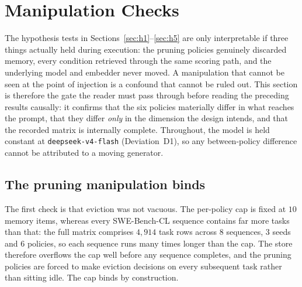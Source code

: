 

\section{Manipulation Checks}
\label{sec:manipulation-checks}

The hypothesis tests in Sections~\ref{sec:h1}--\ref{sec:h5} are only interpretable
if three things actually held during execution: the pruning policies genuinely
discarded memory, every condition retrieved through the same scoring path, and the
underlying model and embedder never moved. A manipulation that cannot be seen at the
point of injection is a confound that cannot be ruled out. This section is therefore
the gate the reader must pass through before reading the preceding results causally:
it confirms that the six policies materially differ in what reaches the prompt, that
they differ \emph{only} in the dimension the design intends, and that the recorded
matrix is internally complete. Throughout, the model is held constant at
\texttt{deepseek-v4-flash} (Deviation~D1), so any between-policy difference cannot be
attributed to a moving generator.

\subsection{The pruning manipulation binds}

The first check is that eviction was not vacuous. The per-policy cap is fixed at
$10$ memory items, whereas every SWE-Bench-CL sequence contains far more tasks than
that: the full matrix comprises $4{,}914$ task rows across $8$ sequences, $3$ seeds
and $6$ policies, so each sequence runs many times longer than the cap. The store
therefore overflows the cap well before any sequence completes, and the pruning
policies are forced to make eviction decisions on every subsequent task rather than
sitting idle. The cap binds by construction.


